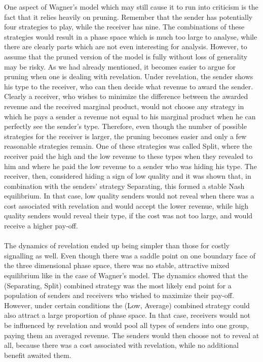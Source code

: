 \documentclass[a4paper,10pt]{article}
\numberwithin{equation}{section}
\begin{document}
One aspect of Wagner's model which may still cause it to run into criticism is the fact that it relies heavily on pruning. Remember that the sender has potentially four strategies to play, while the receiver has nine. The combinations of these strategies would result in a phase space which is much too large to analyse, while there are clearly parts which are not even interesting for analysis. However, to assume that the pruned version of the model is fully without loss of generality may be risky. As we had already mentioned, it becomes easier to argue for pruning when one is dealing with revelation. Under revelation, the sender shows his type to the receiver, who can then decide what revenue to award the sender. Clearly a receiver, who wishes to minimize the difference between the awarded revenue and the received marginal product, would not choose any strategy in which he pays a sender a revenue not equal to his marginal product when he can perfectly see the sender's type. Therefore, even though the number of possible strategies for the receiver is larger, the pruning becomes easier and only a few reasonable strategies remain. One of these strategies was called Split, where the receiver paid the high and the low revenue to these types when they revealed to him and where he paid the low revenue to a sender who was hiding his type. The receiver, then, considered hiding a sign of low quality and it was shown that, in combination with the senders' strategy Separating, this formed a stable Nash equilibrium. In that case, low quality senders would not reveal when there was a cost associated with revelation and would accept the lower revenue, while high quality senders would reveal their type, if the cost was not too large, and would receive a higher pay-off.\\
\\
The dynamics of revelation ended up being simpler than those for costly signalling as well. Even though there was a saddle point on one boundary face of the three dimensional phase space, there was no stable, attractive mixed equilibrium like in the case of Wagner's model. The dynamics showed that the (Separating, Split) combined strategy was the most likely end point for a population of senders and receivers who wished to maximize their pay-off. However, under certain conditions the (Low, Average) combined strategy could also attract a large proportion of phase space. In that case, receivers would not be influenced by revelation and would pool all types of senders into one group, paying them an averaged revenue. The senders would then choose not to reveal at all, because there was a cost associated with revelation, while no additional benefit awaited them.\\
\end{document}
